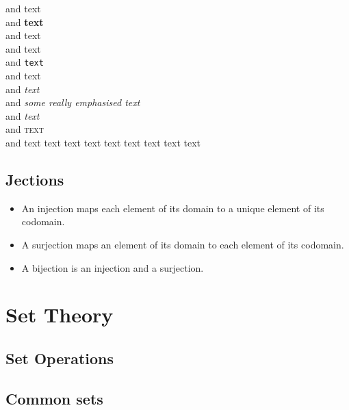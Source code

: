 \documentclass[a4paper,11pt]{article}
\begin{document}
    and \textmd{text} %
  \\and \textbf{text} %
  \\and \textrm{text} %
  \\and \textsf{text} %
  \\and \texttt{text} %
  \\and \textup{text} %
  \\and \textit{text} %
  \\and \emph{some \emph{really} emphasised text} %
  \\and \textsl{text} %
  \\and \textsc{text} %
 {\\and \tiny         %
        \scriptsize   text %
        \footnotesize text %
        \small        text
        \normalsize   text %
        \large        text
        \Large        text
        \LARGE        text
        \huge         text
        \Huge         text}

    \subsection{Jections}


    \begin{itemize}
    \item An injection maps each element of its domain to a unique element of
          its codomain.
    \item A surjection maps an element of its domain to each element of its
          codomain.
    \item A bijection is an injection and a surjection.
    \end{itemize}

    \section{Set Theory}

    \subsection{Set Operations}

    \subsection{Common sets}
\end{document}
